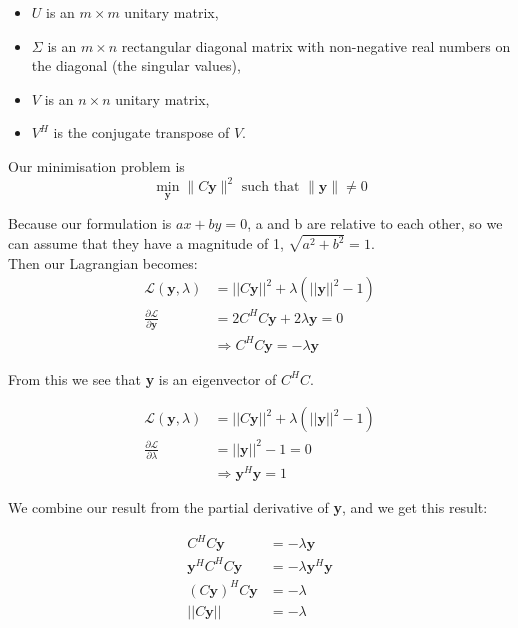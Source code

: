 \begin{itemize}
    \item \( U \) is an \( m \times m \) unitary matrix,
    \item \( \Sigma \) is an \( m \times n \) rectangular diagonal matrix with non-negative real numbers on the diagonal (the singular values),
    \item \( V \) is an \( n \times n \) unitary matrix,
    \item \( V^H \) is the conjugate transpose of \( V \).
\end{itemize}

Our minimisation problem is 
\[\min_{\mathbf{y}}\|C\mathbf{y}\|^2 \text{ such that } \|\mathbf{y}\| \neq 0\]

Because our formulation is $ax + by = 0$, a and b are relative to each other, so we can assume that they have a magnitude of 1, $\sqrt{a^2 + b^2} = 1$.\\

Then our Lagrangian becomes:
\begin{align*}
    \mathcal{L}(\textbf{y}, \lambda)&= ||C\textbf{y}||^2 + \lambda(||\textbf{y}||^2 -1)\\
    \frac{\partial \mathcal{L}}{\partial \textbf{y}} &= 2C^H C \textbf{y} + 2 \lambda \textbf{y} = 0\\
    &\Rightarrow C^H C \textbf{y} = -\lambda \textbf{y}
\end{align*}

From this we see that \textbf{y} is an eigenvector of $C^H C$.

\begin{align*}
    \mathcal{L}(\textbf{y}, \lambda)&= ||C\textbf{y}||^2 + \lambda(||\textbf{y}||^2 -1)\\
    \frac{\partial \mathcal{L}}{\partial \lambda} &= ||\textbf{y}||^2 - 1 = 0 \\
    &\Rightarrow  \textbf{y}^H\textbf{y} = 1
\end{align*}

We combine our result from the partial derivative of \textbf{y}, and we get this result:

\begin{align*}
    C^H C \textbf{y} &= -\lambda \textbf{y}\\
    \textbf{y}^H  C^H C \textbf{y} &= -\lambda \textbf{y}^H \textbf{y}\\
    (C \textbf{y})^H C \textbf{y} &= -\lambda\\
    ||C \textbf{y} || &= -\lambda
\end{align*}

